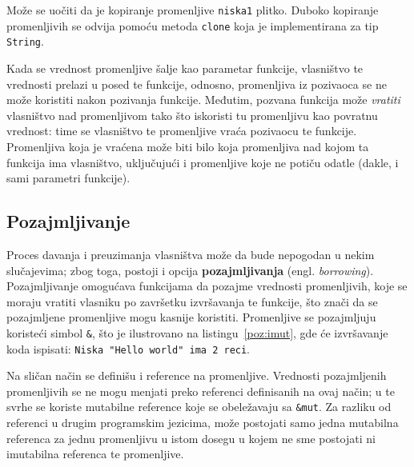 \documentclass[12pt,oneside]{memoir}
\begin{document}


Može se uočiti da je kopiranje promenljive \texttt{niska1} plitko. Duboko kopiranje promenljivih
se odvija pomoću metoda \texttt{clone} koja je implementirana za tip \texttt{String}.


Kada se vrednost promenljive šalje kao parametar funkcije, vlasništvo te vrednosti prelazi
u posed te funkcije, odnosno, promenljiva iz pozivaoca se ne može koristiti nakon pozivanja funkcije.
Međutim, pozvana funkcija može \emph{vratiti} vlasništvo nad promenljivom tako što iskoristi tu
promenljivu kao povratnu vrednost: time se vlasništvo te promenljive vraća pozivaocu te funkcije.
Promenljiva koja je vraćena može biti bilo koja promenljiva nad kojom ta funkcija ima vlasništvo,
uključujući i promenljive koje ne potiču odatle (dakle, i sami parametri funkcije).

\subsection{Pozajmljivanje}\label{subsec:pozajmljivanje}
Proces davanja i preuzimanja vlasništva može da bude nepogodan u nekim slučajevima; zbog toga,
postoji i opcija \textbf{pozajmljivanja} (engl. \emph{borrowing}). Pozajmljivanje omogućava
funkcijama da pozajme vrednosti promenljivih, koje se moraju vratiti vlasniku po završetku
izvršavanja te funkcije, što znači da se pozajmljene promenljive mogu kasnije koristiti.
Promenljive se pozajmljuju koristeći simbol \texttt{\&}, što je ilustrovano na
listingu~\ref{poz:imut}, gde će izvršavanje koda ispisati: \texttt{Niska "Hello world"
ima 2 reci}.



Na sličan način se definišu i reference na promenljive. Vrednosti pozajmljenih promenljivih se ne
mogu menjati preko referenci definisanih na ovaj način; u te svrhe
se koriste mutabilne reference koje se obeležavaju sa \texttt{\&mut}. Za razliku od referenci
u drugim programskim jezicima, može postojati samo jedna mutabilna referenca za jednu
promenljivu u istom dosegu u kojem ne sme postojati ni imutabilna referenca te promenljive.
\end{document}
